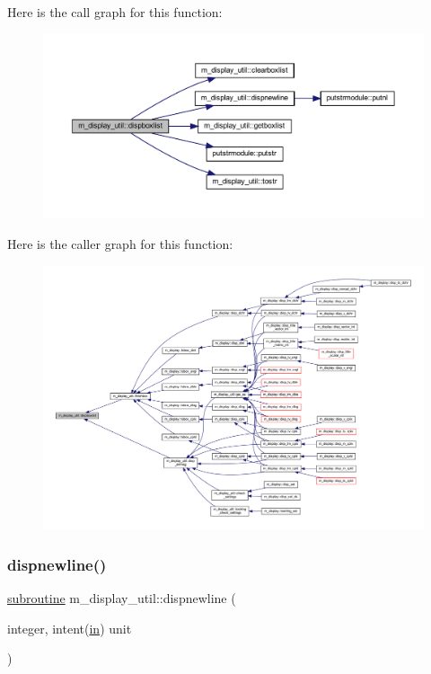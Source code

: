 Here is the call graph for this function\+:
\nopagebreak
\begin{figure}[H]
\begin{center}
\leavevmode
\includegraphics[width=350pt]{namespacem__display__util_af04928d07a7f716a0098c44bdd7ec3fd_cgraph}
\end{center}
\end{figure}
Here is the caller graph for this function\+:
\nopagebreak
\begin{figure}[H]
\begin{center}
\leavevmode
\includegraphics[width=350pt]{namespacem__display__util_af04928d07a7f716a0098c44bdd7ec3fd_icgraph}
\end{center}
\end{figure}
\mbox{\label{namespacem__display__util_a0bbd58b5406fa166a20d83f9737c7acd}} 
\subsubsection{\texorpdfstring{dispnewline()}{dispnewline()}}
{\footnotesize\ttfamily \hyperlink{M__stopwatch_83_8txt_acfbcff50169d691ff02d4a123ed70482}{subroutine} m\+\_\+display\+\_\+util\+::dispnewline (\begin{DoxyParamCaption}\item[{integer, intent(\hyperlink{M__journal_83_8txt_afce72651d1eed785a2132bee863b2f38}{in})}]{unit }\end{DoxyParamCaption})\hspace{0.3cm}{\ttfamily [private]}}



